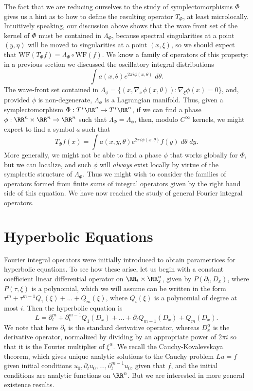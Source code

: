 The fact that we are reducing ourselves to the study of symplectomorphisms $\Phi$ gives us a hint as to how to define the resulting operator $T_\Phi$, at least microlocally. Intuitively speaking, our discussion above shows that the wave front set of the kernel of $\Phi$ must be contained in $\Lambda_\Phi$, because spectral singularities at a point $(y,\eta)$ will be moved to singularities at a point $(x,\xi)$, so we should expect that $\text{WF}(T_\Phi f) = \Lambda_\Phi \circ \text{WF}(f)$. We know a family of operators of this property: in a previous section we discussed the oscillatory integral distributions
%
\[ \int a(x,\theta) e^{2 \pi i \phi(x,\theta)}\; d\theta. \]
%
The wave-front set contained in $\Lambda_\phi = \{ (x,\nabla_x \phi(x,\theta)) : \nabla_\xi \phi(x) = 0 \}$, and, provided $\phi$ is non-degenerate, $\Lambda_\phi$ is a Lagrangian manifold. Thus, given a symplectomorphism $\Phi: T^* \RR^n \to T^* \RR^n$, if we can find a phase $\phi: \RR^n \times \RR^n \to \RR^n$ such that $\Lambda_\Phi = \Lambda_\phi$, then, modulo $C^\infty$ kernels, we might expect to find a symbol $a$ such that
%
\[ T_\Phi f(x) = \int a(x,y,\theta) e^{2 \pi i \phi(x,\theta)} f(y)\; d\theta\; dy. \]
%
More generally, we might not be able to find a phase $\phi$ that works globally for $\Phi$, but we can localize, and such $\phi$ will \emph{always} exist locally by virtue of the symplectic structure of $\Lambda_\Phi$. Thus we might wish to consider the families of operators formed from finite sums of integral operators given by the right hand side of this equation. We have now reached the study of general Fourier integral operators.

\section{Hyperbolic Equations}

Fourier integral operators were initially introduced to obtain parametrices for hyperbolic equations. To see how these arise, let us begin with a constant coefficient linear differential operator on $\RR_t \times \RR^n_x$, given by $P(\partial_t, D_x)$, where $P(\tau, \xi)$ is a polynomial, which we will assume can be written in the form $\tau^m + \tau^{m-1} Q_1(\xi) + \dots + Q_m(\xi)$, where $Q_i(\xi)$ is a polynomial of degree at most $i$. Then the hyperbolic equation is
%
\[ L = \partial_t^m + \partial_t^{m-1} Q_1(D_x) + \dots + \partial_t Q_{m-1}(D_x) + Q_m(D_x). \]
%
We note that here $\partial_t$ is the standard derivative operator, whereas $D_x^\alpha$ is the derivative operator, normalized by dividing by an appropriate power of $2 \pi i$ so that it is the Fourier multiplier of $\xi^\alpha$. We recall the Cauchy-Kovalevskaya theorem, which gives unique analytic solutions to the Cauchy problem $Lu = f$ given initial conditions $u_0,\partial_t u_0, \dots, \partial_t^{m-1} u_0$, given that $f$, and the initial conditions are analytic functions on $\RR^n$. But we are interested in more general existence results.

